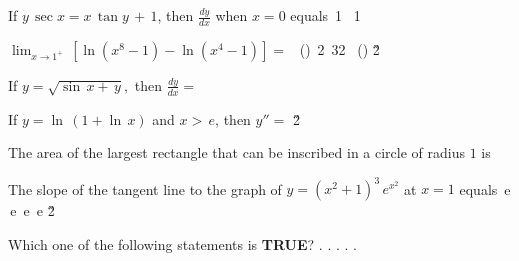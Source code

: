 \documentclass[amsfonts,bezier,leqno,fleqn,12pt,a4paper]{article}
\begin{document}
{{\begin{large}
\item %
If $y\,\sec x=x\, \tan y \,+\, 1$, then $\displaystyle {\frac{dy}{dx}}$ when $x=0$ equals
\sc
\be
\displaystyle {}
\ee
\be
\displaystyle \tan\,1
\ee
{}
\ee
\be
\displaystyle \sec\, 1
\ee
\be
\displaystyle {}
\ee

\newpage



\item %
$\displaystyle \lim_{x\rightarrow 1^+}\, \left[ \ln(x^8-1)-\ln(x^4-1)\right]=$
\sc
\be
\displaystyle \ln\, \left(\displaystyle{}\right)
\ee
\be
\ln\,2
\ee
\be
\ln\,32
\ee
{}
\ee
\be
\displaystyle \ln\, \left(\displaystyle{}\right)
\ee
\v2



\item %
If $y=\sqrt{\sin \,x+\,y},$ then $\displaystyle \frac{dy}{dx}=$
\sc
\be
\displaystyle {}
\ee
\be
\displaystyle {}
\ee
\be
\displaystyle {}
\ee
\be
\displaystyle {}
\ee
\be
\displaystyle {}
\ee

\newpage



\item %
If $\displaystyle y=\ln\,(1+\ln\,x)$ and $x>\,e$, then $y''=$
\sc
\be
\displaystyle {}
\ee
\be
\displaystyle {}
\ee
\be
\displaystyle {}
\ee
\be
\displaystyle {}
\ee
\be
\displaystyle {}
\ee
\v2



\item %
The area of the largest rectangle that can be inscribed in a circle of radius $1$ is
\sc
{}
\ee
{}
\ee
\be
\displaystyle {}
\ee
{}\,\pi
\ee
\be
{}\,
\ee

\newpage



\item %
The slope of the tangent line to the graph of $y=(x^2+1)^3\,e^{x^2}$ at $x=1$ equals
\sc
{}\,e
\ee
{}
\ee
{}\,e
\ee
{}\,e
\ee
{}\,e
\ee
\v2



\item %
Which one of the following statements is \textbf{TRUE}?
\sc
\be
.
\ee
\be
.
\ee
\be
.
\ee
\be
.
\ee
\be
.
\ee


\end{large}}}
\end{document}

